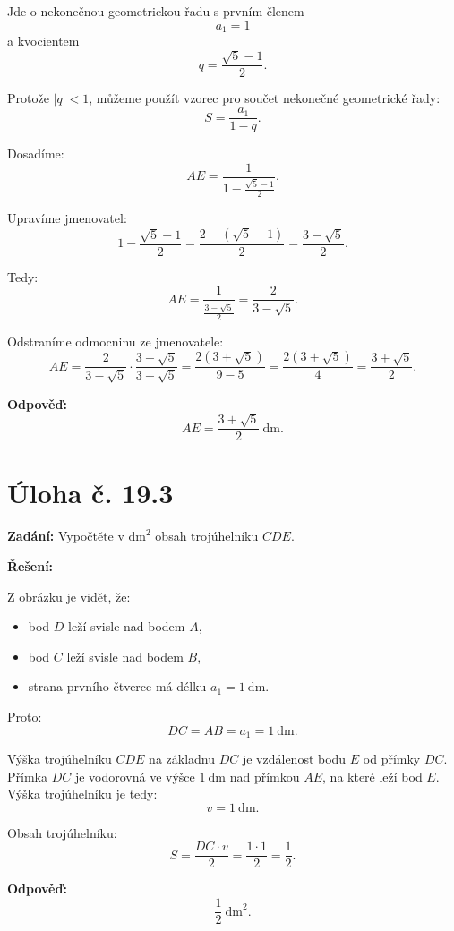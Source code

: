 \documentclass[12pt,a4paper]{article}
\begin{document}
Jde o nekonečnou geometrickou řadu s prvním členem
\[
a_1=1
\]
a kvocientem
\[
q=\frac{\sqrt{5}-1}{2}.
\]

Protože \(|q|<1\), můžeme použít vzorec pro součet nekonečné geometrické řady:
\[
S=\frac{a_1}{1-q}.
\]

Dosadíme:
\[
AE=\frac{1}{1-\frac{\sqrt{5}-1}{2}}.
\]

Upravíme jmenovatel:
\[
1-\frac{\sqrt{5}-1}{2}=\frac{2-(\sqrt{5}-1)}{2}=\frac{3-\sqrt{5}}{2}.
\]

Tedy:
\[
AE=\frac{1}{\frac{3-\sqrt{5}}{2}}=\frac{2}{3-\sqrt{5}}.
\]

Odstraníme odmocninu ze jmenovatele:
\[
AE=\frac{2}{3-\sqrt{5}}\cdot\frac{3+\sqrt{5}}{3+\sqrt{5}}
=\frac{2(3+\sqrt{5})}{9-5}
=\frac{2(3+\sqrt{5})}{4}
=\frac{3+\sqrt{5}}{2}.
\]

\bigskip

\textbf{Odpověď:}  
\[
AE=\frac{3+\sqrt{5}}{2}\ \mathrm{dm}.
\]


\section*{Úloha č. 19.3}

\textbf{Zadání:}  
Vypočtěte v \(\mathrm{dm}^2\) obsah trojúhelníku \(CDE\).

\bigskip

\textbf{Řešení:}

Z obrázku je vidět, že:
\begin{itemize}
    \item bod \(D\) leží svisle nad bodem \(A\),
    \item bod \(C\) leží svisle nad bodem \(B\),
    \item strana prvního čtverce má délku \(a_1=1\ \mathrm{dm}\).
\end{itemize}

Proto:
\[
DC=AB=a_1=1\ \mathrm{dm}.
\]

Výška trojúhelníku \(CDE\) na základnu \(DC\) je vzdálenost bodu \(E\) od přímky \(DC\).  
Přímka \(DC\) je vodorovná ve výšce \(1\ \mathrm{dm}\) nad přímkou \(AE\), na které leží bod \(E\). Výška trojúhelníku je tedy:
\[
v=1\ \mathrm{dm}.
\]

Obsah trojúhelníku:
\[
S=\frac{DC\cdot v}{2}=\frac{1\cdot 1}{2}=\frac12.
\]

\bigskip

\textbf{Odpověď:}  
\[
\frac12\ \mathrm{dm}^2.
\]



\newpage
\end{document}
